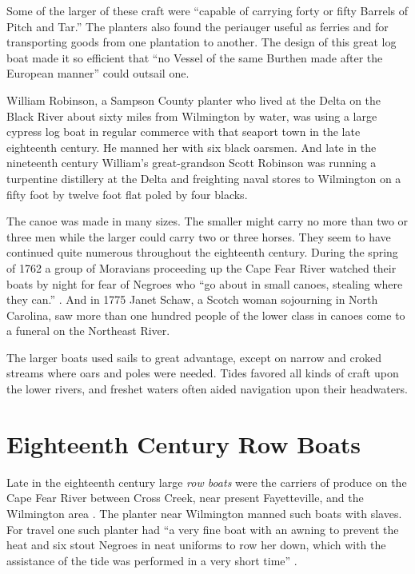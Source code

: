 \documentclass[11pt, a5paper, openright]{book}
\begin{document}
Some of the larger of these craft were ``capable of carrying forty or
fifty Barrels of Pitch and Tar.''  The planters also found the
periauger useful as ferries and for transporting goods from one
plantation to another.  The design of this great log boat made it so
efficient that ``no Vessel of the same Burthen made after the European
manner'' could outsail one.\citep[260-261]{brickellj}\par

William Robinson, a Sampson County planter who lived at the Delta on
the Black River about sixty miles from Wilmington by water, was using
a large cypress log boat in regular commerce with that seaport town in
the late eighteenth century.  He manned her with six black oarsmen.
And late in the nineteenth century William's great-grandson Scott
Robinson was running a turpentine distillery at the Delta and
freighting naval stores to Wilmington on a fifty foot by twelve foot
flat poled by four blacks.  \citep{shawg}\par

The canoe was made in many sizes.  The smaller might carry no more
than two or three men while the larger could carry two or three
horses.  They seem to have continued quite numerous throughout the
eighteenth century.  During the spring of 1762 a group of Moravians
proceeding up the Cape Fear River watched their boats by night for
fear of Negroes who ``go about in small canoes, stealing where they
can.'' \citep[I,~261]{friesal}.  And in 1775 Janet Schaw, a Scotch
woman sojourning in North Carolina, saw more than one hundred people of
the lower class in canoes come to a funeral on the Northeast
River.\citep[171]{schawj}\par

The larger boats used sails to great advantage, except on narrow and
croked streams where oars and poles were needed.  Tides favored all
kinds of craft upon the lower rivers, and freshet waters often aided
navigation upon their headwaters.\par

\section{Eighteenth Century Row Boats}

Late in the eighteenth century large \textit{row boats} were the
carriers of produce on the Cape Fear River between Cross Creek, near
present Fayetteville, and the Wilmington area \citep[280-281]{schawj}.
The planter near Wilmington manned such boats with slaves.  For travel
one such planter had ``a very fine boat with an awning to prevent the
heat and six stout Negroes in neat uniforms to row her down, which with
the assistance of the tide was performed in a very short time''
\citep[177]{schawj}.\par
\end{document}
